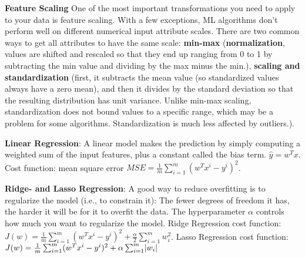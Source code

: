 \textbf{Feature Scaling}
One of the most important transformations you need to apply to your data is feature scaling. With a few exceptions, ML algorithms don’t perform well on different numerical input attribute scales.
There are two common ways to get all attributes to have the same scale: \textbf{min-max} (\textbf{normalization}, values are shifted and rescaled so that they end up ranging from 0 to 1 by subtracting the min value and dividing by the max minus the min.), 
\textbf{scaling and standardization} (first, it subtracts the mean value (so standardized values always have a zero mean), and then it divides by the standard deviation so that the resulting distribution has unit variance.
Unlike min-max scaling, standardization does not bound values to a specific range, which may be a problem for some algorithms.
Standardization is much less affected by outliers.).

\textbf{Linear Regression}:
A linear model makes the prediction by simply computing a weighted sum of the input features, plus a constant called the bias term.
$\hat{y}=w^T x$.
Cost function: mean square error $MSE=\frac{1}{m} \sum_{i=1}^{m} (w^T x^i - y^i)^2$.

\textbf{Ridge- and Lasso Regression}:
A good way to reduce overfitting is to regularize the model (i.e., to constrain it): The fewer degrees of freedom it has, the harder it will be for it to overfit the data.
The hyperparameter $\alpha$ controls how much you want to regularize the model.
Ridge Regression cost function: $J(w) = \frac{1}{m} \sum_{i=1}^{m} (w^T x^i - y^i)^2 + \frac{\alpha}{2} \sum_{i=1}^{m} w_i^2$.
Lasso Regression cost function: $J(w) = \frac{1}{m} \sum_{i=1}^{m} (w^T x^i - y^i)^2 + \alpha \sum_{i=1}^{m} \lvert w_i \rvert$